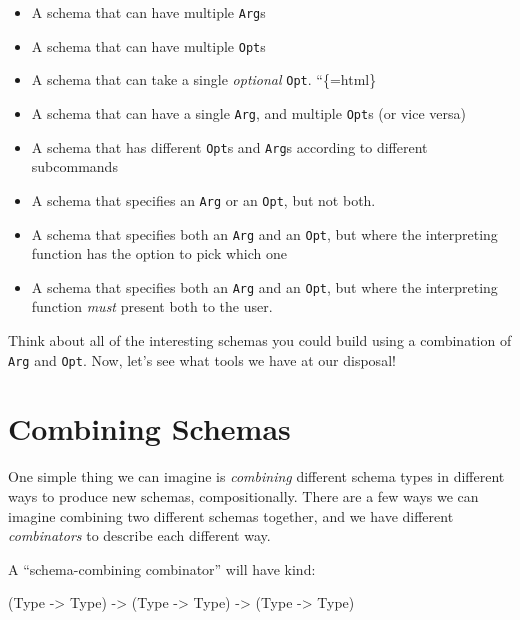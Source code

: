 \documentclass[]{article}
\newenvironment{Shaded}{}{}
\newcommand{\DataTypeTok}[1]{\textcolor[rgb]{0.56,0.13,0.00}{#1}}
\newcommand{\NormalTok}[1]{#1}
\newcommand{\OtherTok}[1]{\textcolor[rgb]{0.00,0.44,0.13}{#1}}
\begin{document}
\begin{itemize}
\tightlist
\item
  A schema that can have multiple \texttt{Arg}s
\item
  A schema that can have multiple \texttt{Opt}s
\item
  A schema that can take a single \emph{optional} \texttt{Opt}. ``\{=html\}
\item
  A schema that can have a single \texttt{Arg}, and multiple \texttt{Opt}s (or
  vice versa)
\item
  A schema that has different \texttt{Opt}s and \texttt{Arg}s according to
  different subcommands
\item
  A schema that specifies an \texttt{Arg} or an \texttt{Opt}, but not both.
\item
  A schema that specifies both an \texttt{Arg} and an \texttt{Opt}, but where
  the interpreting function has the option to pick which one
\item
  A schema that specifies both an \texttt{Arg} and an \texttt{Opt}, but where
  the interpreting function \emph{must} present both to the user.
\end{itemize}

Think about all of the interesting schemas you could build using a combination
of \texttt{Arg} and \texttt{Opt}. Now, let's see what tools we have at our
disposal!

\section{Combining Schemas}\label{combining-schemas}

One simple thing we can imagine is \emph{combining} different schema types in
different ways to produce new schemas, compositionally. There are a few ways we
can imagine combining two different schemas together, and we have different
\emph{combinators} to describe each different way.

A ``schema-combining combinator'' will have kind:

\begin{Shaded}
\begin{Highlighting}[]
\NormalTok{(}\DataTypeTok{Type} \OtherTok{{-}\textgreater{}} \DataTypeTok{Type}\NormalTok{) }\OtherTok{{-}\textgreater{}}\NormalTok{ (}\DataTypeTok{Type} \OtherTok{{-}\textgreater{}} \DataTypeTok{Type}\NormalTok{) }\OtherTok{{-}\textgreater{}}\NormalTok{ (}\DataTypeTok{Type} \OtherTok{{-}\textgreater{}} \DataTypeTok{Type}\NormalTok{)}
\end{Highlighting}
\end{Shaded}
\end{document}
